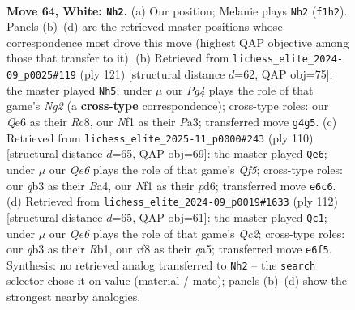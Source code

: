 \documentclass[11pt]{article}
\begin{document}
\clearpage

\begin{figure}[p]\centering
\begin{subfigure}{0.46\textwidth}\centering
\resizebox{\linewidth}{!}{%
\newchessgame
\chessboard[
  setfen={5r1r/p5p1/4Q2p/k2p3P/p2P2P1/1q2P2K/8/4bN2 w - - 36 64},
  showmover=false,
  pgfstyle=straightmove, color=movearrow, markmove={f1-h2}
]}
\caption{}
\end{subfigure}\hfill
\begin{subfigure}{0.46\textwidth}\centering
\resizebox{\linewidth}{!}{%
\newchessgame
\chessboard[
  setfen={2r3k1/5pn1/2P1p1p1/4q1P1/4P3/p2RQ3/2R3K1/8 b - - 3 61},
  showmover=false,
  pgfstyle=straightmove, color=movearrow, markmove={g7-h5}
]}
\caption{}
\end{subfigure}
\\[4pt]
\begin{subfigure}{0.46\textwidth}\centering
\resizebox{\linewidth}{!}{%
\newchessgame
\chessboard[
  setfen={3r1k2/4q3/1R1p1p1p/p1pP1Q2/B1P1p1P1/6K1/8/8 w - - 0 56},
  showmover=false,
  pgfstyle=straightmove, color=movearrow, markmove={f5-e6}
]}
\caption{}
\end{subfigure}\hfill
\begin{subfigure}{0.46\textwidth}\centering
\resizebox{\linewidth}{!}{%
\newchessgame
\chessboard[
  setfen={2r5/k6p/4p1p1/q3P3/1p3P2/2p4P/2Q3PK/1R6 w - - 0 57},
  showmover=false,
  pgfstyle=straightmove, color=movearrow, markmove={c2-c1}
]}
\caption{}
\end{subfigure}
\caption{\textbf{Move 64, White: \texttt{Nh2}.} (a) Our position; Melanie plays \texttt{Nh2} (\texttt{f1h2}). Panels (b)--(d) are the retrieved master positions whose correspondence most drove this move (highest QAP objective among those that transfer to it). (b) Retrieved from \texttt{lichess\_elite\_2024-09\_p0025\#119} (ply 121) [structural distance $d$=62, QAP obj=75]: the master played \texttt{Nh5}; under $\mu$ our \emph{Pg4} plays the role of that game's \emph{Ng2} (a \textbf{cross-type} correspondence); cross-type roles: our \emph{Q}e6 as their \emph{R}c8, our \emph{N}f1 as their \emph{P}a3; transferred move \texttt{g4g5}. (c) Retrieved from \texttt{lichess\_elite\_2025-11\_p0000\#243} (ply 110) [structural distance $d$=65, QAP obj=69]: the master played \texttt{Qe6}; under $\mu$ our \emph{Qe6} plays the role of that game's \emph{Qf5}; cross-type roles: our \emph{q}b3 as their \emph{B}a4, our \emph{N}f1 as their \emph{p}d6; transferred move \texttt{e6c6}. (d) Retrieved from \texttt{lichess\_elite\_2024-09\_p0019\#1633} (ply 112) [structural distance $d$=65, QAP obj=61]: the master played \texttt{Qc1}; under $\mu$ our \emph{Qe6} plays the role of that game's \emph{Qc2}; cross-type roles: our \emph{q}b3 as their \emph{R}b1, our \emph{r}f8 as their \emph{q}a5; transferred move \texttt{e6f5}. Synthesis: no retrieved analog transferred to \texttt{Nh2} -- the \texttt{search} selector chose it on value (material / mate); panels (b)--(d) show the strongest nearby analogies.}
\label{fig:thought-m126}
\end{figure}
\end{document}
